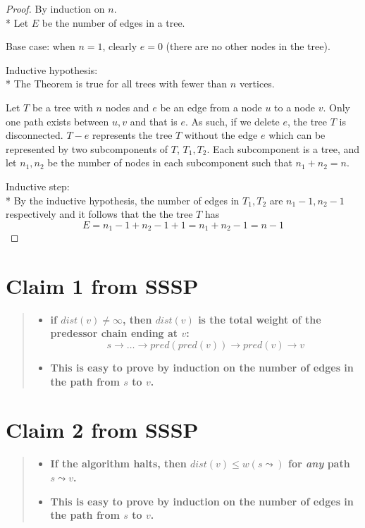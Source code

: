 \documentclass[titlepage]{article}\usepackage[]{graphicx}\usepackage[]{color}
\begin{document}
\begin{proof}
By induction on $n$. \\*
Let $E$ be the number of edges in a tree.

Base case: when $n =1$, clearly $e = 0$ (there are no other nodes in the tree).

Inductive hypothesis: \\*
The Theorem is true for all trees with fewer than $ n$ vertices.

Let $T$ be a tree with $n$ nodes and $e$ be an edge from a node $u$ to a node
$v$. Only one path exists between $u,v$ and that is $e$. As such, if we delete $e$, the
tree $T$ is disconnected. $T - e$ represents the tree $T$ without the edge $e$
which can be represented by two subcomponents of $T$, $T_1, T_2$. Each
subcomponent is a tree, and let $n_1,n_2$ be the number of nodes in each
subcomponent such that $n_1 + n_2 = n$. 

Inductive step: \\*
By the inductive hypothesis, the number of edges in $T_1, T_2$ are $n_1-1,
n_2-1$
respectively and it follows that the the tree $T$ has 
\[ E = n_1 -1 + n_2 -1 +1 = n_1 + n_2-1 = n-1 \]
  \qedhere
\end{proof}


\section{Claim 1 from SSSP}
\begin{quote}
\begin{itemize}
  \item \textbf{if $dist(v) \neq \infty $, then $dist(v)$ is the total weight
	of the predessor chain ending at $v$:
  \[ s \rightarrow \dots \rightarrow pred(pred(v)) \rightarrow pred(v) \rightarrow v \] }
  \item \textbf{This is easy to prove by induction on the number of edges in
	the path from $s$ to $v$.}
\end{itemize}
\end{quote}





\section{Claim 2 from SSSP}
\begin{quote}
\begin{itemize}
  \item \textbf{ If the algorithm halts, then $dist(v) \leq w(s \leadsto )$
	  for \emph{any} path $s \leadsto v$.}
  \item \textbf{This is easy to prove by induction on the number of edges in
	the path from $s$ to $v$.}
\end{itemize}
\end{quote}
\end{document}
